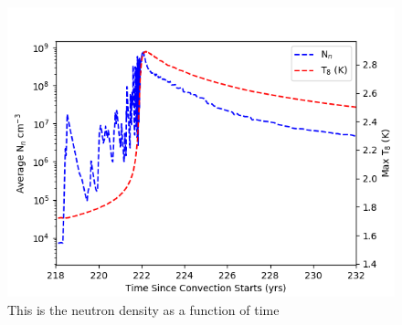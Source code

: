 \documentclass[fleqn,usenatbib]{mnras}
\begin{document}
\begin{figure}
  \includegraphics[width=\columnwidth]{figs/Neutron_Density_Time.png}
  \caption{This is the neutron density as a function of time} 
\end{figure}
\end{document}
